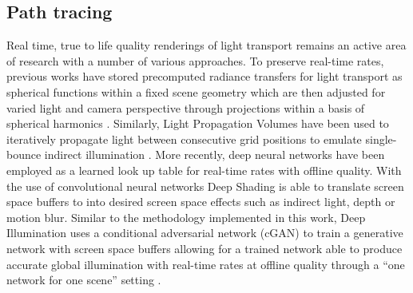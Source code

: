\subsection{Path tracing}
Real time, true to life quality renderings of light transport remains an active area of research with a number of various approaches. To preserve real-time rates, previous works have stored precomputed radiance transfers for light transport as spherical functions within a fixed scene geometry which are then adjusted for varied light and camera perspective through projections within a basis of spherical harmonics \cite{sloanPrecompRad}. Similarly, Light Propagation Volumes have been used to iteratively propagate light between consecutive grid positions to emulate single-bounce indirect illumination \cite{kaplanyanCasac}. More recently, deep neural  networks have been employed as a learned look up table for real-time rates with offline quality. With the use of convolutional neural networks Deep Shading is able to translate screen space buffers to into desired screen space effects such as indirect light, depth or motion blur. Similar to the methodology implemented in this work, Deep Illumination uses a conditional adversarial network (cGAN) to train a generative network with screen space buffers allowing for a trained network able to produce accurate global illumination with real-time rates at offline quality through a ``one network for one scene'' setting  \cite{deepillum}.